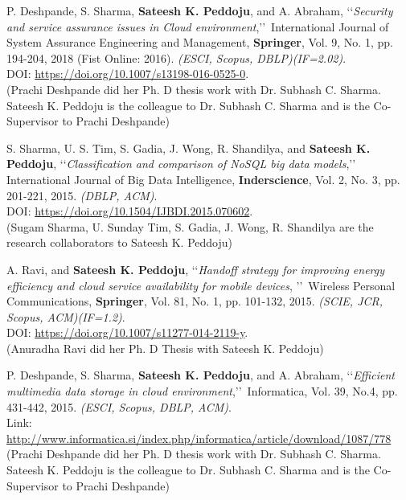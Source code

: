 \begin{etaremune}
	\item
	P. Deshpande, S. Sharma, \textbf{Sateesh K. Peddoju}, and A. Abraham, \lq\lq \textit{Security and service assurance issues in Cloud environment},\rq\rq\, International Journal of System Assurance Engineering and Management, \textbf{Springer}, Vol. 9, No. 1, pp. 194-204, 2018 (Fist Online: 2016). \emph{(ESCI, Scopus, DBLP)(IF=2.02)}. \\DOI: \url{https://doi.org/10.1007/s13198-016-0525-0}.  \\(Prachi Deshpande did her Ph. D thesis work with Dr. Subhash C. Sharma. Sateesh K. Peddoju is the colleague to Dr. Subhash C. Sharma and is the Co-Supervisor to Prachi Deshpande)
	
	\item
	S. Sharma, U. S. Tim, S. Gadia, J. Wong, R. Shandilya, and \textbf{Sateesh K. Peddoju}, \lq\lq \textit{Classification and comparison of NoSQL big data models},\rq\rq\, International Journal of Big Data Intelligence, \textbf{Inderscience}, Vol. 2, No. 3, pp. 201-221, 2015. \emph{(DBLP, ACM)}. \\DOI: \url{https://doi.org/10.1504/IJBDI.2015.070602}.
\\(Sugam Sharma, U. Sunday Tim, S. Gadia, J. Wong, R. Shandilya are the research collaborators to Sateesh K. Peddoju)	
	
	\item
	A. Ravi, and \textbf{Sateesh K. Peddoju}, \lq\lq \textit{Handoff strategy for improving energy efficiency and cloud service availability for mobile devices}, \rq\rq\, Wireless Personal Communications, \textbf{Springer}, Vol. 81, No. 1, pp. 101-132, 2015. \emph{(SCIE, JCR, Scopus, ACM)(IF=1.2)}. \\DOI: \url{https://doi.org/10.1007/s11277-014-2119-y}. \\(Anuradha Ravi did her Ph. D Thesis with Sateesh K. Peddoju)
	
	
	\item
	P. Deshpande, S. Sharma, \textbf{Sateesh K. Peddoju}, and A. Abraham, \lq\lq \textit{Efficient multimedia data storage in cloud environment},\rq\rq\, Informatica, Vol. 39, No.4, pp. 431-442, 2015. \emph{(ESCI, Scopus, DBLP, ACM)}. \\Link: \url{http://www.informatica.si/index.php/informatica/article/download/1087/778} \\(Prachi Deshpande did her Ph. D thesis work with Dr. Subhash C. Sharma. Sateesh K. Peddoju is the colleague to Dr. Subhash C. Sharma and is the Co-Supervisor to Prachi Deshpande)
	

\end{etaremune}
